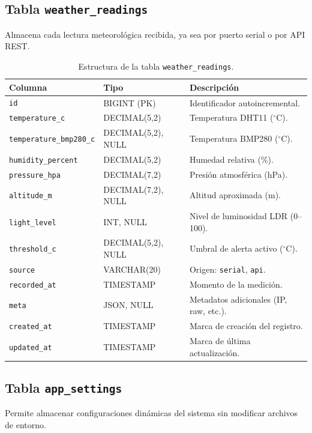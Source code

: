 \subsection{Tabla \texttt{weather\_readings}}

Almacena cada lectura meteorológica recibida, ya sea por puerto serial o por API REST.

\begin{table}[H]
\centering
\caption{Estructura de la tabla \texttt{weather\_readings}.}
\label{tab:weather-readings}
\begin{tabular}{@{}llp{5.5cm}@{}}
\toprule
\textbf{Columna} & \textbf{Tipo} & \textbf{Descripción} \\
\midrule
\texttt{id} & BIGINT (PK) & Identificador autoincremental. \\
\texttt{temperature\_c} & DECIMAL(5,2) & Temperatura DHT11 ($^\circ$C). \\
\texttt{temperature\_bmp280\_c} & DECIMAL(5,2), NULL & Temperatura BMP280 ($^\circ$C). \\
\texttt{humidity\_percent} & DECIMAL(5,2) & Humedad relativa (\%). \\
\texttt{pressure\_hpa} & DECIMAL(7,2) & Presión atmosférica (hPa). \\
\texttt{altitude\_m} & DECIMAL(7,2), NULL & Altitud aproximada (m). \\
\texttt{light\_level} & INT, NULL & Nivel de luminosidad LDR (0--100). \\
\texttt{threshold\_c} & DECIMAL(5,2), NULL & Umbral de alerta activo ($^\circ$C). \\
\texttt{source} & VARCHAR(20) & Origen: \texttt{serial}, \texttt{api}. \\
\texttt{recorded\_at} & TIMESTAMP & Momento de la medición. \\
\texttt{meta} & JSON, NULL & Metadatos adicionales (IP, raw, etc.). \\
\texttt{created\_at} & TIMESTAMP & Marca de creación del registro. \\
\texttt{updated\_at} & TIMESTAMP & Marca de última actualización. \\
\bottomrule
\end{tabular}
\end{table}

\subsection{Tabla \texttt{app\_settings}}

Permite almacenar configuraciones dinámicas del sistema sin modificar archivos de entorno.

